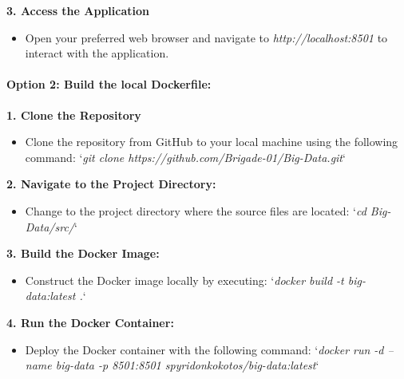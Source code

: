 \documentclass[unnumsec,webpdf,contemporary,large]{oup-authoring-template}%
\theoremstyle{thmstyleone}%
\theoremstyle{thmstyletwo}%
\theoremstyle{thmstylethree}%
\begin{document}
\textbf{3. Access the Application}
\vspace{0.2cm}

\begin{itemize}
    \item Open your preferred web browser and navigate to \textit{http://localhost:8501} to interact with the application.
\end{itemize}
\vspace{0.2cm}

\paragraph{\textbf{Option 2}: Build the local Dockerfile:}
\vspace{0.2cm}

\textbf{1. Clone the Repository}
\vspace{0.2cm}

\begin{itemize}
    \item Clone the repository from GitHub to your local machine using the following command: `\textit{git clone https://github.com/Brigade-01/Big-Data.git}`
\end{itemize}
\vspace{0.2cm}

\textbf{2. Navigate to the Project Directory:}
\vspace{0.2cm}

\begin{itemize}
    \item Change to the project directory where the source files are located: `\textit{cd Big-Data/src/}`
\end{itemize}
\vspace{0.2cm}

\textbf{3. Build the Docker Image:}
\vspace{0.2cm}

\begin{itemize}
    \item Construct the Docker image locally by executing: `\textit{docker build -t big-data:latest .}`
\end{itemize}
\vspace{0.2cm}

\textbf{4. Run the Docker Container:}
\vspace{0.2cm}

\begin{itemize}
    \item Deploy the Docker container with the following command: `\textit{docker run -d --name big-data -p 8501:8501 spyridonkokotos/big-data:latest}`
\end{itemize}
\vspace{0.2cm}
\end{document}
